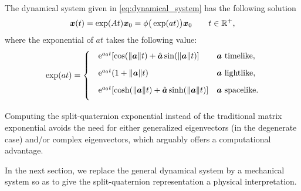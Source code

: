 The dynamical system given in \cref{eq:dynamical_system} has the following solution \cite{Arnold1984}
\begin{equation}
    \vec{x}(t) = \exp(At)\vec{x}_0 = \phi\big(\exp(at)\big)\vec{x}_0\qquad t \in \real^+,
\end{equation}
where the exponential of $at$ takes the following value: 
\begin{equation}
    \exp(a t) = 
    \begin{cases}
        \phantom \quad \ec^{a_0 t}\qty[\cos(\norm{\vec{a}} t) + \uvec{a}\sin(\norm{\vec{a}} t)] & \vec{a} \text{ timelike}, \\[1.5ex]
        \phantom \quad \ec^{a_0 t}\qty(1 + \norm{\vec{a}}t ) & \vec{a} \text{ lightlike}, \\[1.5ex]
        \phantom \quad \ec^{a_0 t}\qty[\cosh(\norm{\vec{a}} t) + \uvec{a}\sinh(\norm{\vec{a}} t)] & \vec{a} \text{ spacelike}. \\[1.5ex]
    \end{cases}
    \label{eq:system_solution}
\end{equation}

Computing the split-quaternion exponential instead of the traditional matrix exponential avoids the need for either generalized eigenvectors (in the degenerate case) and/or complex eigenvectors, which arguably offers a computational advantage. 

In the next section, we replace the general dynamical system by a mechanical system so as to give the split-quaternion representation a physical interpretation.

